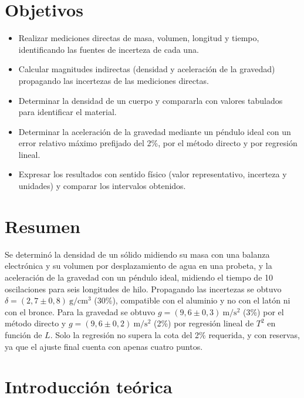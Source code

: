 \documentclass[12pt,a4paper]{article}
\begin{document}
\section{Objetivos}
\begin{itemize}
  \item Realizar mediciones directas de masa, volumen, longitud y tiempo, identificando las
        fuentes de incerteza de cada una.
  \item Calcular magnitudes indirectas (densidad y aceleración de la gravedad) propagando las
        incertezas de las mediciones directas.
  \item Determinar la densidad de un cuerpo y compararla con valores tabulados para
        identificar el material.
  \item Determinar la aceleración de la gravedad mediante un péndulo ideal con un error
        relativo máximo prefijado del 2\%, por el método directo y por regresión lineal.
  \item Expresar los resultados con sentido físico (valor representativo, incerteza y
        unidades) y comparar los intervalos obtenidos.
\end{itemize}

\setcounter{section}{0}
\renewcommand{\thesection}{2.\arabic{section}}
\renewcommand{\theHsection}{2.\arabic{section}}
\section{Resumen}
Se determinó la densidad de un sólido midiendo su masa con una balanza electrónica y su
volumen por desplazamiento de agua en una probeta, y la aceleración de la gravedad con un
péndulo ideal, midiendo el tiempo de 10 oscilaciones para seis longitudes de hilo. Propagando
las incertezas se obtuvo $\delta = (2{,}7 \pm 0{,}8)\ \mathrm{g/cm^3}$ (30\%), compatible con
el aluminio y no con el latón ni con el bronce. Para la gravedad se obtuvo
$g = (9{,}6 \pm 0{,}3)\ \mathrm{m/s^2}$ (3\%) por el método directo y
$g = (9{,}6 \pm 0{,}2)\ \mathrm{m/s^2}$ (2\%) por regresión lineal de $T^2$ en función
de $L$. Solo la regresión no supera la cota del 2\% requerida, y con reservas, ya que el
ajuste final cuenta con apenas cuatro puntos.

\section{Introducción teórica}
\end{document}
